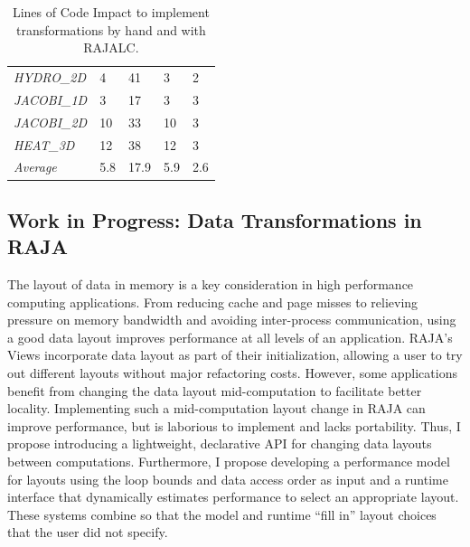 \documentclass{article}
\begin{document}
\begin{table}[t]
\begin{tabular}{|l|l|l|l|l|}
    \textit{HYDRO\_2D}       & 4                                               & 41                                           & 3                                              & 2                                            \\
    \textit{JACOBI\_1D}      & 3                                               & 17                                           & 3                                              & 3                                            \\
    \textit{JACOBI\_2D}      & 10                                              & 33                                           & 10                                             & 3                                            
    \\
    \textit{HEAT\_3D}        & 12                                              & 38                                           & 12                                             & 3                                            \\ \hline
    \textit{Average}        & 5.8                                              & 17.9                                           & 5.9                                            & 2.6                                            \\ \hline
    \end{tabular}
    \caption{Lines of Code Impact to implement transformations by hand and with RAJALC.}\label{sloc}
    \end{table}


\subsection{Work in Progress: Data Transformations in RAJA}
\label{Sec:Work2}
The layout of data in memory is a key consideration in high performance computing applications.
From reducing cache and page misses to relieving pressure on memory bandwidth and avoiding inter-process communication, using a good data layout improves performance at all levels of an application.
RAJA's Views incorporate data layout as part of their initialization, allowing a user to try out different layouts without major refactoring costs.
However, some applications benefit from changing the data layout mid-computation to facilitate better locality.
Implementing such a mid-computation layout change in RAJA can improve performance, but is laborious to implement and lacks portability.
Thus, I propose introducing a lightweight, declarative API for changing data layouts between computations.
Furthermore, I propose developing a performance model for layouts using the loop bounds and data access order as input and a runtime interface that dynamically estimates performance to select an appropriate layout. 
These systems combine so that the model and runtime \enquote{fill in} layout choices that the user did not specify.
\end{document}
